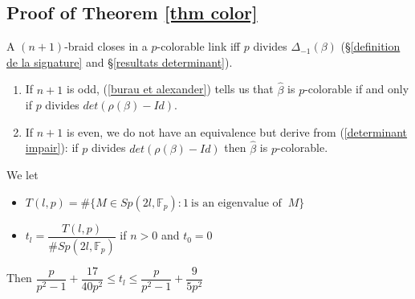 \documentclass[12pt]{article}
\begin{document}
\subsection{Proof of Theorem \ref{thm color}}\label{proof colorable} 
A $(n+1)$-braid closes in a  $p$-colorable link iff $p$ divides $\Delta_{-1}(\beta)$ (\S \ref{definition de la signature} and \S \ref{resultats determinant}). \begin{enumerate}
	\item 
 If $n+1$ is odd, (\ref{burau et alexander}) tells us that $\hat{\beta}$ is $p$-colorable if and only if $p$ divides $det(\rho(\beta)-Id)$. 
 \item If $n+1$ is even, we do not have an equivalence but derive from (\ref{determinant impair}): if $p$ divides $det(\rho(\beta)-Id)$ then $\hat{\beta}$ is $p$-colorable. 
\end{enumerate}
\begin{lem}\label{estimee de tn}
	We let
\begin{itemize}
	\item $T(l,p)=\#\{M\in Sp(2l, \mathbb{F}_p): 1\ \mbox{is an eigenvalue of }\ M\}$
	\item $t_l=\dfrac{T(l,p)}{\# Sp(2l, \mathbb{F}_p)}$ if $n>0$ and $t_0=0$
\end{itemize}
Then $\dfrac{p}{p^2-1}+\dfrac{17}{40p^2}\leq t_l\leq \dfrac{p}{p^2-1}+\dfrac{9}{5p^2}$
\end{lem}
\end{document}

